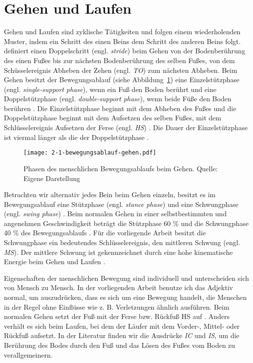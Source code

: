\section{Gehen und Laufen}
\label{sec:gehen_und_laufen}

Gehen und Laufen sind zyklische Tätigkeiten und folgen einem wiederholenden Muster, indem ein Schritt des einen Beins dem Schritt des anderen Beins folgt. \citet[][S.~9]{Bartlett2007} definiert einen Doppelschritt (engl. \emph{stride}) beim Gehen von der Bodenberührung des einen Fußes bis zur nächsten Bodenberührung des selben Fußes, von dem Schüsselereignis Abheben der Zehen (engl. \emph{\ac{TO}}) zum nächsten Abheben. Beim Gehen besitzt der Bewegungsablauf (siehe Abbildung~\ref{fig:2_1_bewegungsablauf_gehen}) eine Einzelstützphase (engl. \emph{single-support phase}), wenn ein Fuß den Boden berührt und eine Doppelstützphase (engl. \emph{double-support phase}), wenn beide Füße den Boden berühren \citep[vgl.][]{Bartlett2007}. Die Einzelstützphase beginnt mit dem Abheben des Fußes und die Doppelstützphase beginnt mit dem Aufsetzen des selben Fußes, mit dem Schlüsselereignis Aufsetzen der Ferse (engl. \emph{\ac{HS}}) \citep[vgl.][]{Bartlett2007}. Die Dauer der Einzelstützphase ist viermal länger als die der Doppelstützphase \citep[vgl.][]{Bartlett2007}.

\begin{figure}[t]
	\centering
		\texttt{[image: 2-1-bewegungsablauf-gehen.pdf]}
	\caption[Phasen des menschlichen Bewegungsablaufs beim Gehen]{Phasen des menschlichen Bewegungsablaufs beim Gehen. Quelle: Eigene Darstellung}
	\label{fig:2_1_bewegungsablauf_gehen}
\end{figure}

Betrachten wir alternativ jedes Bein beim Gehen einzeln, besitzt es im Bewegungsablauf eine Stützphase (engl. \emph{stance phase}) und eine Schwungphase (engl. \emph{swing phase}) \citep[vgl.][]{Bartlett2007}. Beim normalen Gehen in einer selbstbestimmten und angenehmen Geschwindigkeit beträgt die Stützphase 60 \% und die Schwungphase 40 \% des Bewegungsablaufs \citep[vgl.][]{Bartlett2007}. Für die vorliegende Arbeit besitzt die Schwungphase ein bedeutendes Schlüsselereignis, den mittleren Schwung (engl. \emph{\ac{MS}}). Der mittlere Schwung ist gekennzeichnet durch eine hohe kinematische Energie beim Gehen und Laufen \citep[vgl.][]{Novacheck1998}.

Eigenschaften der menschlichen Bewegung sind individuell und unterscheiden sich von Mensch zu Mensch. In der vorliegenden Arbeit benutze ich das Adjektiv normal, um auszudrücken, dass es sich um eine Bewegung handelt, die Menschen in der Regel ohne Einflüsse wie z. B. Verletzungen ähnlich ausführen. Beim normalen Gehen setzt der Fuß mit der Ferse bzw. Rückfuß \ac{HS} auf \citep[vgl.][S.~33]{Marquardt2011}. Anders verhält es sich beim Laufen, bei dem der Läufer mit dem Vorder-, Mittel- oder Rückfuß aufsetzt. In der Literatur finden wir die Ausdrücke \emph{\ac{IC}} und \emph{\ac{IS}}, um die Berührung des Bodes durch den Fuß und das Lösen des Fußes vom Boden zu verallgemeinern.

